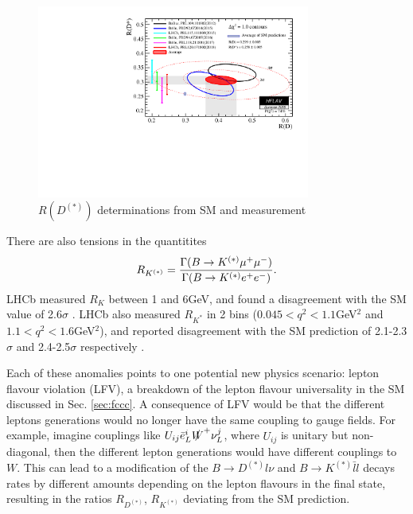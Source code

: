 \begin{figure}
  \begin{center}
    \includegraphics[width=
      0.8\textwidth]{images/rdrds_summer18.pdf}
  \end{center}
  \caption{$R(D^{(*)})$ determinations from SM and measurement
    \cite{HFLAV16}
    \label{fig:ratiotension}}
\end{figure}

There are also tensions in the quantitites \cite{Altmannshofer:2017yso}
\begin{align}
  R_{K^{(*)}} = {\Gamma( B\to K^{(*)}\mu^+\mu^-)\over \Gamma( B\to K^{(*)} e^+e^-)}.
\end{align}
LHCb measured $R_K$ between 1 and 6GeV, and found a disagreement with the SM value \cite{Bobeth:2007dw,Bouchard:2013mia} of 2.6$\sigma$ \cite{Aaij:2014ora}. LHCb also measured $R_{K^*}$ in 2 bins ($0.045<q^2<1.1 $GeV$^2$ and $1.1<q^2<1.6$GeV$^2$), and reported disagreement with the SM prediction \cite{Bordone:2016gaq,Descotes-Genon:2015uva,Capdevila:2016ivx,Capdevila:2017ert,Serra:2016ivr,Straub:2015ica,Altmannshofer:2017fio,Jager:2014rwa} of 2.1-2.3$\sigma$ and 2.4-2.5$\sigma$ respectively \cite{Aaij:2017vbb}.


Each of these anomalies points to one potential new physics scenario: lepton flavour violation (LFV), a breakdown of the lepton flavour universality in the SM discussed in Sec. \ref{sec:fccc}. A consequence of LFV would be that the different leptons generations would no longer have the same coupling to gauge fields. For example, imagine couplings like $U_{ij} \bar{e}_L^i \slashed{W}^+ \nu_L^j$, where $U_{ij}$ is unitary but non-diagonal, then the different lepton generations would have different couplings to $W$. This can lead to a modification of the $B\to D^{(*)}l\nu$ and $B\to K^{(*)}\bar{l}l$ decays rates by different amounts depending on the lepton flavours in the final state, resulting in the ratios $R_{D^{(*)}}$, $R_{K^{(*)}}$ deviating from the SM prediction.

